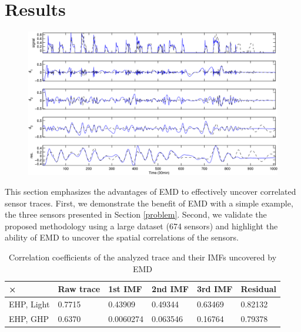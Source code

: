 \section{Results}


\begin{figure}[tb]
\begin{center}
\includegraphics[width=\textwidth]{img/emd_25_26}
\caption{}
\label{fig:emd}
\end{center}
\end{figure}

This section emphasizes the advantages of EMD to effectively uncover correlated sensor traces.
First, we demonstrate the benefit of EMD with a simple example, the three sensors presented in Section \ref{problem}.
Second, we validate the proposed methodology using a large dataset (674 sensors) and highlight the ability of EMD to uncover the spatial correlations of the sensors.

\begin{table}
\begin{center}
\begin{tabular}{|l|l|l|l|l|l|}
\hline
× & Raw trace & 1st IMF & 2nd IMF & 3rd IMF & Residual\\ \hline
EHP, Light & 0.7715 & 0.43909 & 0.49344 & 0.63469 & 0.82132 \\ \hline
EHP, GHP & 0.6370 & 0.0060274 & 0.063546 & 0.16764 & 0.79378 \\ \hline
\end{tabular}
\caption{Correlation coefficients of the analyzed trace and their IMFs uncovered by EMD}
\label{tab:corr}
\end{center}
\end{table}
